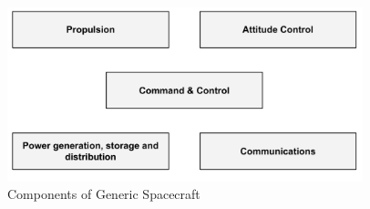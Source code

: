 \begin{figure}[htb]
\begin{center}
\includegraphics[width=0.92\textwidth]{img/generic_structure.pdf}
\caption{Components of Generic Spacecraft}
\label{fig:generic_structure}
\end{center}
\end{figure}
